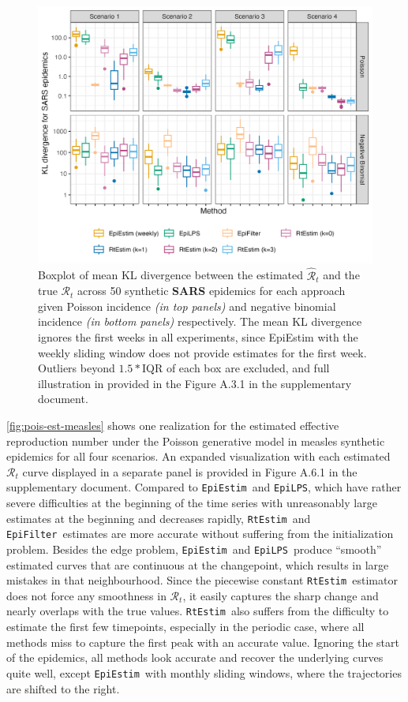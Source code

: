 \documentclass[10pt,letterpaper]{article}
\def\RtEstim{\texttt{RtEstim}}
\def\EpiEstim{\texttt{EpiEstim}}
\def\EpiLPS{\texttt{EpiLPS}}
\def\EpiFilter{\texttt{EpiFilter}}
\def\calR{\mathcal{R}}
\begin{document}
\begin{figure}[!ht]
  \centering
  \includegraphics[width=.99\textwidth]{fig/fig_kl_week_sars.png}
  \caption{Boxplot of mean KL divergence between the estimated 
  $\hat{\calR}_t$ and the true $\calR_t$ across 50 synthetic \textbf{SARS} epidemics for 
  each approach given Poisson incidence \textit{(in top panels)} and negative 
  binomial incidence \textit{(in bottom panels)} respectively. 
  The mean KL divergence ignores the first weeks in all experiments, 
  since EpiEstim with the weekly sliding window does not provide estimates 
  for the first week. Outliers beyond $1.5*$IQR of each box are excluded, 
  and full illustration in provided in the Figure A.3.1 in the supplementary document.} 
  \label{fig:kl-res-sars}
\end{figure}

\autoref{fig:pois-est-measles} shows one realization for the estimated effective 
reproduction number under the Poisson generative model in measles synthetic 
epidemics for all four scenarios. An expanded visualization with each estimated 
$\calR_t$ curve displayed in a separate panel is provided in Figure A.6.1 in the supplementary document. 
Compared to \EpiEstim\ and \EpiLPS, which have rather severe difficulties at the beginning
of the time series with unreasonably large estimates at the beginning and decreases rapidly, 
\RtEstim\ and \EpiFilter\ estimates are more accurate without suffering from the 
initialization problem. Besides the edge problem, \EpiEstim\ and \EpiLPS\ produce 
``smooth'' estimated curves that are continuous at the changepoint, which results 
in large mistakes in that neighbourhood. Since the piecewise constant \RtEstim\ 
estimator does not force any smoothness in $\calR_t$, it easily captures the 
sharp change and nearly overlaps with the true values. \RtEstim\ also suffers from 
the difficulty to estimate the first few timepoints, especially in the periodic 
case, where all methods miss to capture the first peak with an accurate value. 
Ignoring the start of the epidemics, all methods look accurate and recover 
the underlying curves quite well, except \EpiEstim\ with monthly sliding windows, 
where the trajectories are shifted to the right. 
\end{document}
